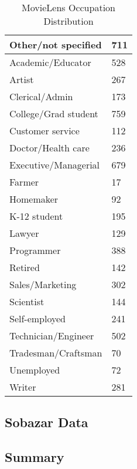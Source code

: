 \begin{table}
\centering
\begin{tabular}{|l|l|}
\hline
Other/not specified  & 711  \\ \hline
Academic/Educator  & 528  \\ \hline
Artist  & 267 \\ \hline
Clerical/Admin & 173 \\ \hline
College/Grad student  & 759 \\ \hline
Customer service & 112 \\ \hline
Doctor/Health care & 236 \\ \hline
Executive/Managerial & 679 \\ \hline
Farmer & 17 \\ \hline
Homemaker & 92 \\ \hline
K-12 student & 195 \\ \hline
Lawyer & 129 \\ \hline
Programmer & 388 \\ \hline
Retired & 142 \\ \hline
Sales/Marketing & 302 \\ \hline
Scientist & 144 \\ \hline
Self-employed & 241 \\ \hline
Technician/Engineer & 502 \\ \hline
Tradesman/Craftsman & 70 \\ \hline
Unemployed & 72 \\ \hline
Writer & 281 \\ \hline
\end{tabular}
\caption{MovieLens Occupation Distribution}
\end{table}



\subsection{Sobazar Data}

	

\subsection{Summary}

